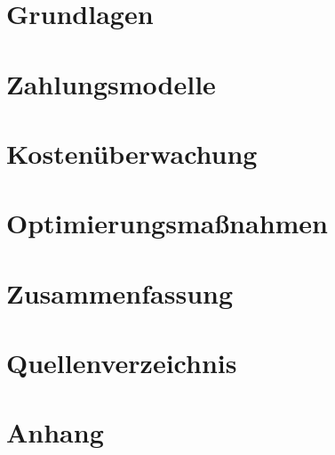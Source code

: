 \documentclass[a4paper,12pt,oneside]{article}
\begin{document}
\section{Grundlagen}\label{kap_grundlagen}


\section{Zahlungsmodelle}\label{kap_zahlungsmodelle}

\newpage

\section{Kostenüberwachung}\label{kap_kostenueberwachung}

\newpage

\section{Optimierungsmaßnahmen}\label{kap_Optimierung}

\newpage

\section*{Zusammenfassung}\label{kap_zusammfAusbl}

\newpage

\section*{Quellenverzeichnis}\label{kap_quellenverzeichnis}

\newpage

\setcounter{section}{0} %
\renewcommand*\thesection{\Alph{section}} %

\section*{Anhang}\label{anhang}

\newpage
\end{document}
